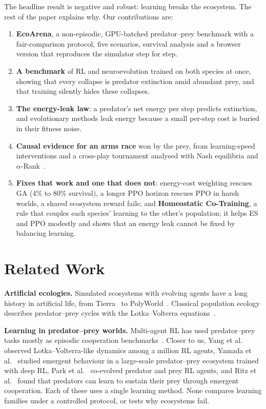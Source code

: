 \documentclass[conference]{IEEEtran}
\begin{document}
The headline result is negative and robust: learning breaks the ecosystem. The rest of the paper explains why. Our contributions are:
\begin{enumerate}
  \item \textbf{EcoArena}, a non-episodic, GPU-batched predator--prey benchmark with a fair-comparison protocol, five scenarios, survival analysis and a browser version that reproduces the simulator step for step.
  \item \textbf{A benchmark} of RL and neuroevolution trained on both species at once, showing that every collapse is predator extinction amid abundant prey, and that training silently hides these collapses.
  \item \textbf{The energy-leak law}: a predator's net energy per step predicts extinction, and evolutionary methods leak energy because a small per-step cost is buried in their fitness noise.
  \item \textbf{Causal evidence for an arms race} won by the prey, from learning-speed interventions and a cross-play tournament analysed with Nash equilibria and $\alpha$-Rank~\cite{omidshafiei2019}.
  \item \textbf{Fixes that work and one that does not}: energy-cost weighting rescues GA (4\% to 80\% survival), a longer PPO horizon rescues PPO in harsh worlds, a shared ecosystem reward fails; and \textbf{Homeostatic Co-Training}, a rule that couples each species' learning to the other's population; it helps ES and PPO modestly and shows that an energy leak cannot be fixed by balancing learning.
\end{enumerate}

\section{Related Work}

\textbf{Artificial ecologies.} Simulated ecosystems with evolving agents have a long history in artificial life, from Tierra~\cite{ray1991} to PolyWorld~\cite{yaeger1994}. Classical population ecology describes predator--prey cycles with the Lotka--Volterra equations~\cite{lotka1920,volterra1926}.

\textbf{Learning in predator--prey worlds.} Multi-agent RL has used predator--prey tasks mostly as episodic cooperation benchmarks~\cite{lowe2017}. Closer to us, Yang et al.~\cite{yang2018} observed Lotka--Volterra-like dynamics among a million RL agents, Yamada et al.~\cite{yamada2020} studied emergent behaviour in a large-scale predator--prey ecosystem trained with deep RL, Park et al.~\cite{park2021} co-evolved predator and prey RL agents, and Ritz et al.~\cite{ritz2021} found that predators can learn to sustain their prey through emergent cooperation. Each of these uses a single learning method. None compares learning families under a controlled protocol, or tests why ecosystems fail.
\end{document}
